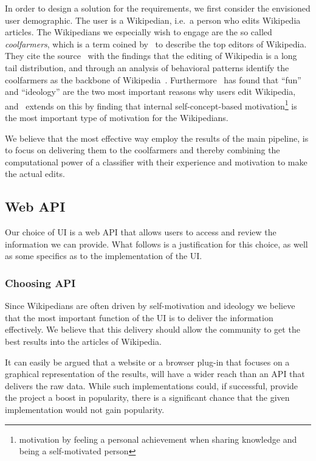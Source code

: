In order to design a solution for the requirements, we first consider the envisioned user demographic. The user is a Wikipedian, i.e.\ a person who edits Wikipedia articles. The Wikipedians we especially wish to engage are the so called \emph{coolfarmers}, which is a term coined by~\cite{coolfarming} to describe the top editors of Wikipedia. They cite the source~\cite{Priedhorsky:2007:CDR:1316624.1316663} with the findings that the editing of Wikipedia is a long tail distribution, and through an analysis of behavioral patterns identify the coolfarmers as the backbone of Wikipedia~\cite{coolfarming}. Furthermore~\cite{wiki_motivation} has found that \enquote{fun} and \enquote{ideology} are the two most important reasons why users edit Wikipedia, and~\cite{Yang20101377} extends on this by finding that internal self-concept-based motivation\footnote{motivation by feeling a personal achievement when sharing knowledge and being a self-motivated person} is the most important type of motivation for the Wikipedians.

We believe that the most effective way employ the results of the main pipeline, is to focus on delivering them to the coolfarmers and thereby combining the computational power of a classifier with their experience and motivation to make the actual edits.


\subsection{Web API}

Our choice of UI is a web API that allows users to access and review the information we can provide. What follows is a justification for this choice, as well as some specifics as to the implementation of the UI\@.

\subsubsection{Choosing API}
Since Wikipedians are often driven by self-motivation and ideology we believe that the most important function of the UI is to deliver the information effectively. We believe that this delivery should allow the community to get the best results into the articles of Wikipedia.

It can easily be argued that a website or a browser plug-in that focuses on a graphical representation of the results, will have a wider reach than an API that delivers the raw data. While such implementations could, if successful, provide the project a boost in popularity, there is a significant chance that the given implementation would not gain popularity.


